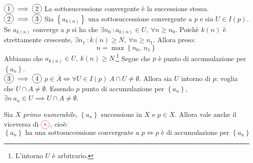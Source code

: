 \begin{demonstration}~{}\\
$\circled{1}\implies\circled{2}$ La sottosuccessione convergente è la successione stessa.\\
$\circled{2}\implies\circled{3}$ Sia $\left\{a_{k\left(n\right)}\right\}$ una sottosuccessione convergente a $p$ e sia $U\in I\left(p\right)$. \\
Se $a_{k\left(n\right)}$ converge a $p$ si ha che $\exists n_0\ \colon a_{k\left(n\right)}\in U,\ \forall n\geq n_0$. Poichè $k\left(n\right)$ è strettamente crescente, $\exists n_1\ \colon k\left(n\right)\geq N,\ \forall n\geq n_1$. Allora preso:
\begin{equation*}
	n=\max\left\{n_0,\ n_1\right\}
\end{equation*}
Abbiamo che $a_{k\left(n\right)}\in U,\ k\left(n\right)\geq N$.\footnote{L'intorno $U$ è arbitrario.} Segue che $p$ è punto di accumulazione per $\left\{a_n\right\}$.\\
$\circled{3}\implies\circled{4}$ $p\in \overline{A}\iff \forall U\in I\left(p\right)\ A\cap U\neq \emptyset$. Allora sia $U$ intorno di $p$: voglia che $U\cap A\neq \emptyset$. Essendo $p$ punto di accumulazione per $\left\{a_n\right\}$, $\exists n\ a_n\in U\implies U\cap A\neq \emptyset$.
\end{demonstration}
\begin{lemming}\label{primonumesucc}
Sia $X$ \textit{primo numerabile}, $\left\{a_n\right\}$ successione in $X$ e $p\in X$. Allora vale anche il viceversa di $\textcolor{red}{\circled{\ast}}$, cioè:
\begin{equation}
	\left\{a_n\right\}\text{ ha una sottosuccessione convergente a }p\iff p\text{ è di accumulazione per }\left\{a_n\right\}
\end{equation}
\end{lemming}
